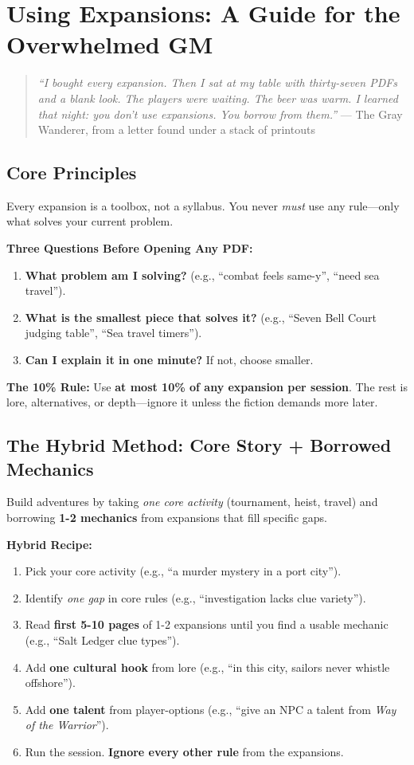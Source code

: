 \clearpage
\chapter{Using Expansions: A Guide for the Overwhelmed GM}
\label{ch:using-expansions}

\begin{quote}
\small
\emph{``I bought every expansion. Then I sat at my table with thirty-seven PDFs and a blank look. The players were waiting. The beer was warm. I learned that night: you don't use expansions. You borrow from them.''}
--- The Gray Wanderer, from a letter found under a stack of printouts
\end{quote}

\section{Core Principles}
Every expansion is a toolbox, not a syllabus. You never \textit{must} use any rule---only what solves your current problem. 

\textbf{Three Questions Before Opening Any PDF:}
\begin{enumerate}
  \item \textbf{What problem am I solving?} (e.g., ``combat feels same-y'', ``need sea travel'').
  \item \textbf{What is the smallest piece that solves it?} (e.g., ``Seven Bell Court judging table'', ``Sea travel timers'').
  \item \textbf{Can I explain it in one minute?} If not, choose smaller.
\end{enumerate}

\textbf{The 10\% Rule:} Use \textbf{at most 10\% of any expansion per session}. The rest is lore, alternatives, or depth---ignore it unless the fiction demands more later.

\section{The Hybrid Method: Core Story + Borrowed Mechanics}
Build adventures by taking \textit{one core activity} (tournament, heist, travel) and borrowing \textbf{1-2 mechanics} from expansions that fill specific gaps.

\textbf{Hybrid Recipe:}
\begin{enumerate}
  \item Pick your core activity (e.g., ``a murder mystery in a port city'').
  \item Identify \textit{one gap} in core rules (e.g., ``investigation lacks clue variety'').
  \item Read \textbf{first 5-10 pages} of 1-2 expansions until you find a usable mechanic (e.g., ``Salt Ledger clue types'').
  \item Add \textbf{one cultural hook} from lore (e.g., ``in this city, sailors never whistle offshore'').
  \item Add \textbf{one talent} from player-options (e.g., ``give an NPC a talent from \textit{Way of the Warrior}'').
  \item Run the session. \textbf{Ignore every other rule} from the expansions.
\end{enumerate}

